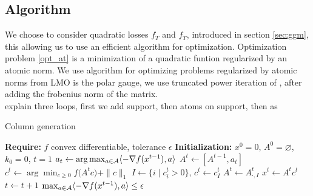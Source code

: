 \subsection{Algorithm}
We choose to consider quadratic losses $f_{T}$ and $f_{T}$, introduced in section \ref{sec:ggm}, this allowing us to use an efficient algorithm for optimization. Optimization problem \ref{opt_at} is a minimization of a quadratic funtion regularized by an atomic norm. We use algorithm for optimizing problems regularized by atomic norms from \citet{vinyes2017} LMO is the polar gauge,  we use truncated power iteration of \citet{yuan2013truncated}, after adding the frobenius norm of the matrix.\\

explain three loops, first we add support, then atoms on support, then as 

 \begin{algorithm}
   \caption{Column generation}
\label{alg:colgen}
\begin{algorithmic}[1]
\State\textbf{Require: } $f$ convex differentiable, tolerance $\epsilon$ 
\State\textbf{Initialization: } $x^0=0$, $A^0=\varnothing$, $k_0=0$, $t=1$
\Repeat
\State $a_{t}\gets \arg\max_{a \in \mathcal{A}} \langle-\nabla f(x^{t-1}),a\rangle$ %
\State $A^t \gets [A^{t-1},a_{t}]$
\State $c^t\gets \arg\min_{c \geq 0} f \big (A^{t} c \big ) + \|c\|_1$ %
\State $I\gets \{i \mid c_i^t>0\}$,
\State $c^t \gets c^t_{I}$
\State $A^t \gets A^t_{\cdot,I}$
\State $x^t\gets A^{t}c^t$
\State $t \gets t+1$
\Until $\max_{a \in \mathcal{A}} \langle-\nabla f(x^{t-1}),a\rangle\leq \epsilon$
\end{algorithmic}
  \end{algorithm}





